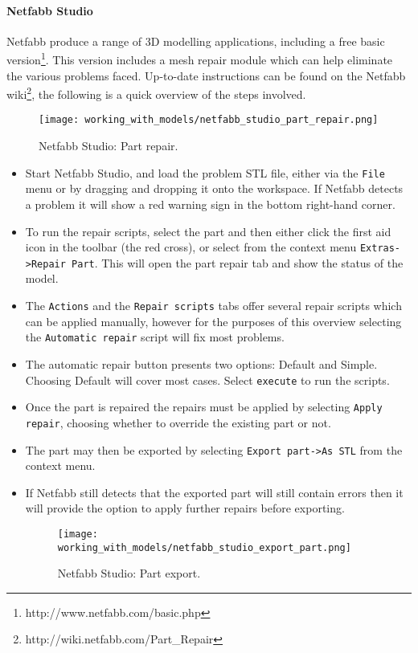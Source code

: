 
\paragraph{Netfabb Studio} %
\label{par:netfabb_studio}
Netfabb produce a range of 3D modelling applications, including a free basic version\footnote{http://www.netfabb.com/basic.php}.  This version includes a mesh repair module which can help eliminate the various problems faced.  Up-to-date instructions can be found on the Netfabb wiki\footnote{http://wiki.netfabb.com/Part\_Repair}, the following is a quick overview of the steps involved.

\begin{figure}[H]
\centering
\texttt{[image: working\_with\_models/netfabb\_studio\_part\_repair.png]}
\caption{Netfabb Studio: Part repair.}
\label{fig:netfabb_studio_part_repair}
\end{figure}

\begin{itemize}
	\item Start Netfabb Studio, and load the problem STL file, either via the \texttt{File} menu or by dragging and dropping it onto the workspace. If Netfabb detects a problem it will show a red warning sign in the bottom right-hand corner.
	\item To run the repair scripts, select the part and then either click the first aid icon in the toolbar (the red cross), or select from the context menu \texttt{Extras->Repair Part}.  This will open the part repair tab and show the status of the model.
	\item The \texttt{Actions} and the \texttt{Repair scripts} tabs offer several repair scripts which can be applied manually, however for the purposes of this overview selecting the \texttt{Automatic repair} script will fix most problems.
	\item The automatic repair button presents two options: Default and Simple.  Choosing Default will cover most cases. Select \texttt{execute} to run the scripts.
	\item Once the part is repaired the repairs must be applied by selecting \texttt{Apply repair}, choosing whether to override the existing part or not.
	\item The part may then be exported by selecting \texttt{Export part->As STL} from the context menu.
	\item If Netfabb still detects that the exported part will still contain errors then it will provide the option to apply further repairs before exporting.
	\begin{figure}[H]
	\centering
	\texttt{[image: working\_with\_models/netfabb\_studio\_export\_part.png]}
	\caption{Netfabb Studio: Part export.}
	\label{fig:netfabb_studio_export_part}
	\end{figure}
\end{itemize}

